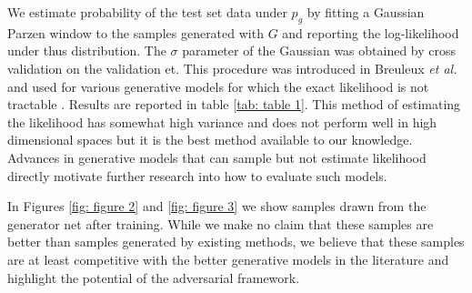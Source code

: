 We estimate probability of the test set data under $p_g$ by fitting a Gaussian Parzen window to the samples generated with $G$ and reporting the log-likelihood under thus distribution. The $\sigma$ parameter of the Gaussian was obtained by cross validation on the validation et. This procedure was introduced in Breuleux \emph{et al.} \cite{8_6796083} and used for various generative models for which the exact likelihood is not tractable \cite{25_10.5555/3042573.3042804,3_pmlr-v28-bengio13,5_bengio2014deepgenerativestochasticnetworks}. Results are reported in table \ref{tab: table 1}. This method of estimating the likelihood has somewhat high variance and does not perform well in high dimensional spaces but it is the best method available to our knowledge. Advances in generative models{} that can sample but not estimate likelihood directly motivate further research into how to evaluate such models.

In Figures \ref{fig: figure 2} and \ref{fig: figure 3} we show samples drawn from the generator net after training. While we make no claim that these samples are better than samples generated by existing methods, we believe that these samples are at least competitive with the better generative models in the literature and highlight the potential of the adversarial framework.

